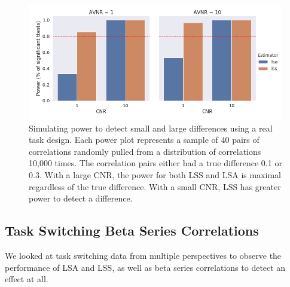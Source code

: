\documentclass[10pt,letterpaper]{article}
\begin{document}
\begin{figure}[H]
  \centering
    \includegraphics[width=\textwidth]{taskswitch-switchXrepeat_largediff}
  \caption{
    Simulating power to detect small and large differences using
    a real task design.
    Each power plot represents a sample of 40 pairs of correlations
    randomly pulled from a distribution of correlations 10,000 times.
    The correlation pairs either had a true difference 0.1 or 0.3.
    With a large CNR, the power for both LSS and LSA
    is maximal regardless of the true difference.
    With a small CNR, LSS has greater power to detect a difference.
  }
  \label{fig:task_largediff}
\end{figure}

\subsection*{Task Switching Beta Series Correlations}
We looked at task switching data from multiple perspectives to observe the performance of LSA and LSS,
as well as beta series correlations to detect an effect at all.
\end{document}
